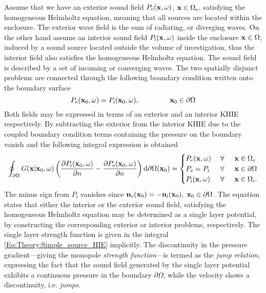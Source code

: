 Assume that we have an exterior sound field $P_{\mathrm{e}}(\mathbf{x},\omega)$, $\mathbf{x} \in \Omega_{\mathrm{e}}$, satisfying the homogeneous Helmholtz equation, meaning that all sources are located within the enclosure. The exterior wave field is the sum of  radiating, or diverging waves. On the other hand assume an interior sound field $P_{\mathrm{i}}(\mathbf{x},\omega)$ inside the enclosure $\mathbf{x} \in \Omega$, induced by a sound source located outside the volume of investigation, thus the interior field also satisfies the homogeneous Helmholtz equation. The sound field is described by a set of incoming or converging waves.
The two spatially disjunct problems are connected through the following boundary condition written onto the boundary surface
\begin{equation}
P_{\mathrm{e}}(\vxo,\omega) = P_{\mathrm{i}}(\vxo,\omega), \hspace{15mm} \vxo \in \partial \Omega
\end{equation}
Both fields may be expressed in terms of an exterior and an interior KHIE respectively.
By subtracting the exterior from the interior KHIE due to the coupled boundary condition terms containing the pressure on the boundary vanish and the following integral expression is obtained \cite[p.~268.]{Williams1999}
\begin{equation}
\oint_{\partial \Omega} 
G(\mathbf{x}|\mathbf{x}_0,\omega) 
\left(
\frac{\partial P_{\mathrm{i}}(\mathbf{x}_0,\omega)}{\partial n} - \frac{\partial P_{\mathrm{e}}(\mathbf{x}_0,\omega)}{\partial n} 
\right)
\mathrm{d} \partial \Omega ( \mathbf{x}_0)
= 
\begin{cases} 
P_{\mathrm{e}}(\mathbf{x},\omega)           & \hspace{1mm} \forall \hspace{5mm}  \mathbf{x} \in \Omega_e  	   \\
P_{\mathrm{e}}=P_{\mathrm{i}} & \hspace{1mm} \forall \hspace{5mm}         \mathbf{x} \in \partial \Omega  \\
P_{\mathrm{i}}(\mathbf{x},\omega) 			& \hspace{1mm} \forall \hspace{5mm}   \mathbf{x} \in \Omega_i.
\end{cases}
\label{Eq:Theory:Simple_source_HIE}
\end{equation}
The minus sign from $P_{\mathrm{i}}$ vanishes since $\mathbf{n}_{\mathrm{e}}(\mathbf{x}_0) = -\mathbf{n}_{\mathrm{i}}(\mathbf{x}_0), \hspace{1mm} {\mathbf{x}_0}\in \partial \Omega$. The equation states that either the interior or the exterior sound field, satisfying the homogeneous Helmholtz equation may be determined as a single layer potential, by constructing the corresponding exterior or interior problems, respectively.
The single layer strength function is given in the integral \eqref{Eq:Theory:Simple_source_HIE} implicitly.
The discontinuity in the pressure gradient---giving the monopole \emph{strength function}---is termed as the \emph{jump relation}, expressing the fact that the sound field generated by the single layer potential exhibits a continuous pressure in the boundary $\partial \Omega$, while the velocity shows a discontinuity, i.e. \emph{jumps}.

